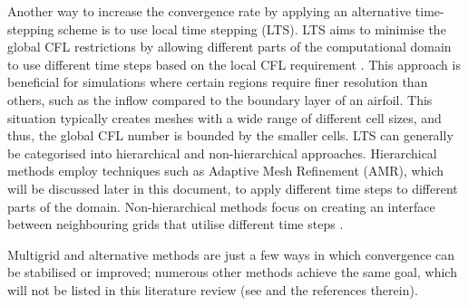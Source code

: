 Another way to increase the convergence rate by applying an alternative time-stepping scheme is to use local time stepping (LTS). LTS aims to minimise the global CFL restrictions by allowing different parts of the computational domain to use different time steps based on the local CFL requirement \cite{Esnault2010}. This approach is beneficial for simulations where certain regions require finer resolution than others, such as the inflow compared to the boundary layer of an airfoil. This situation typically creates meshes with a wide range of different cell sizes, and thus, the global CFL number is bounded by the smaller cells. LTS can generally be categorised into hierarchical and non-hierarchical approaches. Hierarchical methods employ techniques such as Adaptive Mesh Refinement (AMR), which will be discussed later in this document, to apply different time steps to different parts of the domain. Non-hierarchical methods focus on creating an interface between neighbouring grids that utilise different time steps \cite{Esnault2010}.

Multigrid and alternative methods are just a few ways in which convergence can be stabilised or improved; numerous other methods achieve the same goal, which will not be listed in this literature review (see \cite{Nived2025, vermeire2013, Esnault2010, Kalkote2019, Sreejith2022} and the references therein). 




